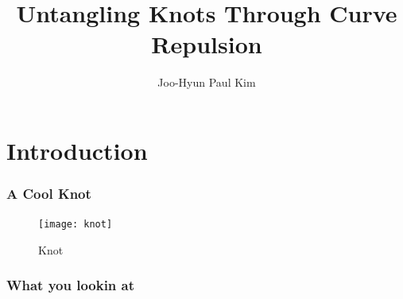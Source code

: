 \documentclass{beamer}
\title{Untangling Knots Through Curve Repulsion}
\author{Joo-Hyun Paul Kim}
\begin{document}
\begin{frame}
    \maketitle
\end{frame}

\section{Introduction}
\begin{frame}
    \frametitle{A Cool Knot}
    \begin{figure}[h]
        \centering
        \texttt{[image: knot]}
        \caption{Knot}
    \end{figure}

\end{frame}
\begin{frame}
    \frametitle{What you lookin at}

\end{frame}
\end{document}
